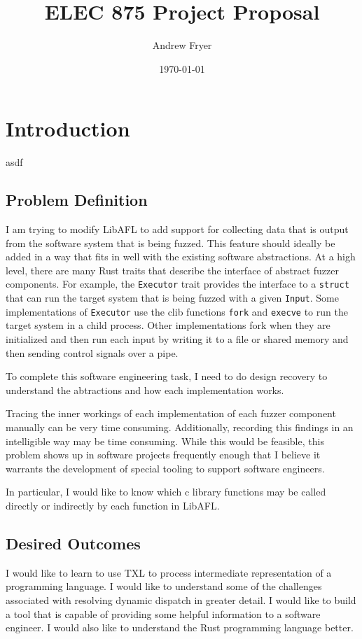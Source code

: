 \documentclass[11pt]{article}
\title{ELEC 875 Project Proposal}
\author{Andrew Fryer}
\date{\today}
\begin{document}
\maketitle

\section{Introduction}
asdf

\subsection{Problem Definition}

I am trying to modify LibAFL to add support for collecting data that is output from the software system that is being fuzzed.
This feature should ideally be added in a way that fits in well with the existing software abstractions.
At a high level, there are many Rust traits that describe the interface of abstract fuzzer components.
For example, the \lstinline{Executor} trait provides the interface to a \lstinline{struct} that can run the target system that is being fuzzed with a given \lstinline{Input}.
Some implementations of \lstinline{Executor} use the clib functions \lstinline{fork} and \lstinline{execve} to run the target system in a child process.
Other implementations fork when they are initialized and then run each input by writing it to a file or shared memory and then sending control signals over a pipe.

To complete this software engineering task, I need to do design recovery to understand the abtractions and how each implementation works.

Tracing the inner workings of each implementation of each fuzzer component manually can be very time consuming.
Additionally, recording this findings in an intelligible way may be time consuming.
While this would be feasible, this problem shows up in software projects frequently enough that I believe it warrants the development of special tooling to support software engineers.

In particular, I would like to know which c library functions may be called directly or indirectly by each function in LibAFL.

\subsection{Desired Outcomes}
I would like to learn to use TXL to process intermediate representation of a programming language.
I would like to understand some of the challenges associated with resolving dynamic dispatch in greater detail.
I would like to build a tool that is capable of providing some helpful information to a software engineer.
I would also like to understand the Rust programming language better.
\end{document}
